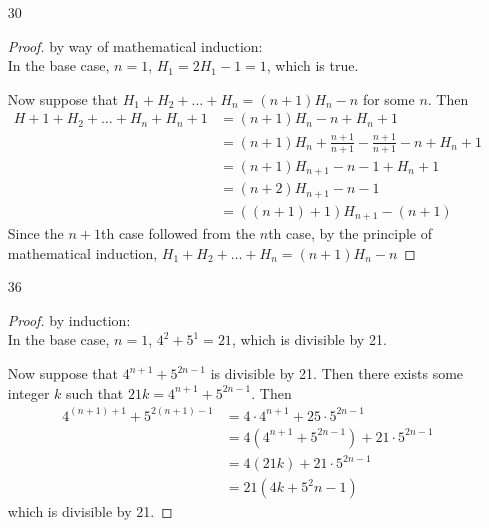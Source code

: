 \documentclass{article}
\begin{document}
\begin{enumerate}
\begin{proof}
      Then $\frac{1}{2n} \leq \frac{1 \cdot 3 \cdot \dots \cdot (2n-1)}
      {2\cdot4\cdot \dots \cdot 2n}\equiv \frac{1}{2n}\frac{2n}{2n+2} \leq
      \frac{1 \cdot 3 \cdot \dots \cdot (2n-1)}{2\cdot4\cdot \dots \cdot 2n}
      \frac{2n}{2n+2}$ (given that $\frac{2n}{2n+2}$ is positive, which it is
      as $n$ is positive), which is less than
      $\frac{1\cdot3\cdot \dots \cdot (2(n+1)-1)}
      {2\cdot 4 \cdot \dots \cdot 2(n+2)}$. By the transitivity of inequality,
      then, $1/(2(n+1)) \leq \frac{1 \cdot 3 \cdot \dots \cdot (2(n+1)-1)}
      {2\cdot4\cdot \dots \cdot (2(n+1))}$.

      Since the $n+1$ case followed from the $n$ case, by the principle of
      mathematical induction, the inequality is true when $n$ is a positive
      integer.
    \end{proof}
  \item[30]
    \begin{proof} by way of mathematical induction:\\
      In the base case, $n=1$, $H_1 = 2H_1 - 1 = 1$, which is true.

      Now suppose that $H_1 + H_2 + \dots + H_n = (n+1)H_n -n$ for some $n$.
      Then
      \begin{align*}
        H+1 + H_2 + \dots + H_n + H_n+1
        &= (n+1)H_n - n + H_n+1\\
        &= (n+1)H_n + \frac{n+1}{n+1} - \frac{n+1}{n+1} -n + H_n+1\\
        &= (n+1)H_{n+1} - n - 1 + H_n+1\\
        &= (n+2)H_{n+1} - n - 1\\
        &= ((n+1) + 1)H_{n+1} - (n+1)
      \end{align*}
      Since the $n+1$th case followed from the $n$th case, by the principle
      of mathematical induction,
      $H_1 + H_2 + \dots + H_n = (n+1)H_n -n$
    \end{proof}
  \item[36]
    \begin{proof} by induction:\\
      In the base case, $n=1$, $4^2+5^1=21$, which is divisible by 21.

      Now suppose that $4^{n+1} + 5^{2n-1}$ is divisible by 21. Then there
      exists some integer $k$ such that $21k=4^{n+1} + 5^{2n-1}$. Then
      \begin{align*}
        4^{(n+1)+1} + 5^{2(n+1)-1}
        &= 4 \cdot 4^{n+1} + 25 \cdot 5^{2n-1}\\
        &= 4 (4^{n+1} + 5^{2n-1}) + 21 \cdot 5^{2n-1}\\
        &= 4 (21k) + 21 \cdot 5^{2n-1}\\
        &= 21(4k + 5^2n-1)
      \end{align*}
      which is divisible by 21.


\end{proof}
\end{enumerate}
\end{document}
